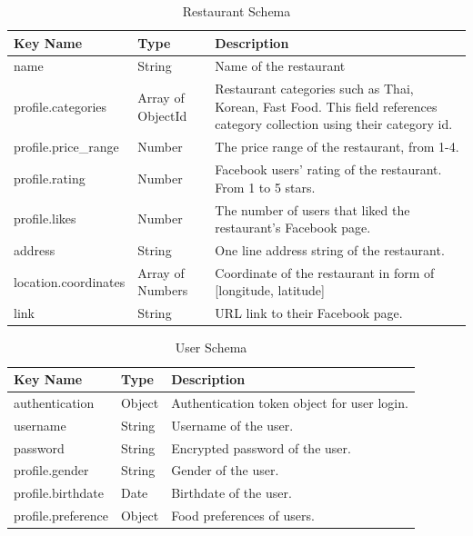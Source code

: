 \documentclass[12pt,oneside,openright,a4paper]{cpe-english-project}
\begin{document}
\begin{table}[!h]
\caption{Restaurant Schema}\label{tbl:3RestaurantSchema}
\begin{tabularx}{\textwidth}{l|l|X} \hline\hline
Key Name & Type & Description \\ \hline\hline
name & String & Name of the restaurant \\ \hline
profile.categories & Array of ObjectId & Restaurant categories such as Thai, Korean, Fast Food. This field references category collection using their category id. \\ \hline
profile.price\_range & Number & The price range of the restaurant, from 1-4. \\ \hline
profile.rating & Number & Facebook users’ rating of the restaurant. From 1 to 5 stars. \\ \hline
profile.likes & Number & The number of users that liked the restaurant’s Facebook page. \\ \hline
address & String & One line address string of the restaurant. \\ \hline
location.coordinates & Array of Numbers & Coordinate of the restaurant in form of [longitude, latitude] \\ \hline
link & String & URL link to their Facebook page. \\ \hline\hline
\end{tabularx}
\end{table}

\begin{table}[!h]
\caption{User Schema}\label{tbl:3UserSchema}
\begin{tabularx}{\textwidth}{l|l|X} \hline\hline
Key Name & Type & Description \\ \hline\hline
authentication & Object & Authentication token object for user login. \\ \hline
username & String & Username of the user. \\ \hline
password & String & Encrypted password of the user. \\ \hline
profile.gender & String & Gender of the user. \\ \hline
profile.birthdate & Date & Birthdate of the user. \\ \hline
profile.preference & Object & Food preferences of users. \\ \hline\hline
\end{tabularx}
\end{table}
\end{document}
